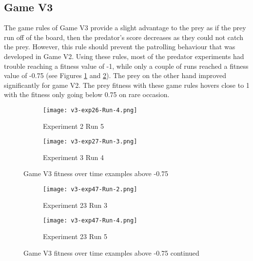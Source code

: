 \subsection{Game V3}
The game rules of Game V3 provide a slight advantage to the prey as if the prey run off of the board, then the predator's score decreases as they could not catch the prey. However, this rule should prevent the patrolling behaviour that was developed in Game V2. Using these rules, most of the predator experiments had trouble reaching a fitness value of -1, while only a couple of runs reached a fitness value of -0.75 (see Figures \ref{fig:v3-pred-runs} and \ref{fig:v3-pred-runs-2}). The prey on the other hand improved significantly for game V2. The prey fitness with these game rules hovers close to 1 with the fitness only going below 0.75 on rare occasion. 


\begin{figure}
  \centering
  \begin{subfigure}{0.7\textwidth}
    \centering
    \texttt{[image: v3-exp26-Run-4.png]}
    \caption{Experiment 2 Run 5}
  \end{subfigure}
  \begin{subfigure}{0.7\textwidth}
    \centering
    \texttt{[image: v3-exp27-Run-3.png]}
    \caption{Experiment 3 Run 4}
  \end{subfigure}
    \caption{Game V3 fitness over time examples above -0.75\label{fig:v3-pred-runs}}
\end{figure}




\begin{figure}
  \centering
    \begin{subfigure}{0.7\textwidth}
    \centering
    \texttt{[image: v3-exp47-Run-2.png]}
    \caption{Experiment 23 Run 3}
  \end{subfigure}
  \begin{subfigure}{0.7\textwidth}
    \centering
    \texttt{[image: v3-exp47-Run-4.png]}
    \caption{Experiment 23 Run 5}
  \end{subfigure}
  \caption{Game V3 fitness over time examples above -0.75 continued\label{fig:v3-pred-runs-2}}
\end{figure}

